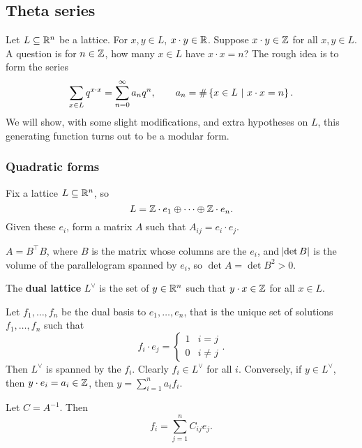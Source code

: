 \pagebreak

\subsection{Theta series}

Let $ L \subseteq \mathbb{R}^n $ be a lattice. For $ x, y \in L $, $ x \cdot y \in \mathbb{R} $. Suppose $ x \cdot y \in \mathbb{Z} $ for all $ x, y \in L $. A question is for $ n \in \mathbb{Z} $, how many $ x \in L $ have $ x \cdot x = n $? The rough idea is to form the series
$$ \sum_{x \in L} q^{x \cdot x} = \sum_{n = 0}^\infty a_nq^n, \qquad a_n = \#\cbr{x \in L \st x \cdot x = n}. $$
We will show, with some slight modifications, and extra hypotheses on $ L $, this generating function turns out to be a modular form.

\subsubsection{Quadratic forms}

Fix a lattice $ L \subseteq \mathbb{R}^n $, so
$$ L = \mathbb{Z} \cdot e_1 \oplus \dots \oplus \mathbb{Z} \cdot e_n. $$
Given these $ e_i $, form a matrix $ A $ such that $ A_{ij} = e_i \cdot e_j $.

\begin{note*}
$ A = B^\intercal B $, where $ B $ is the matrix whose columns are the $ e_i $, and $ \abs{\det B} $ is the volume of the parallelogram spanned by $ e_i $, so $ \det A = \det B^2 > 0 $.
\end{note*}

\begin{definition}
The \textbf{dual lattice} $ L^\vee $ is the set of $ y \in \mathbb{R}^n $ such that $ y \cdot x \in \mathbb{Z} $ for all $ x \in L $.
\end{definition}

Let $ f_1, \dots, f_n $ be the dual basis to $ e_1, \dots, e_n $, that is the unique set of solutions $ f_1, \dots, f_n $ such that
$$ f_i \cdot e_j =
\begin{cases}
1 & i = j \\
0 & i \ne j
\end{cases}.
$$
Then $ L^\vee $ is spanned by the $ f_i $. Clearly $ f_i \in L^\vee $ for all $ i $. Conversely, if $ y \in L^\vee $, then $ y \cdot e_i = a_i \in \mathbb{Z} $, then $ y = \sum_{i = 1}^n a_if_i $.

\begin{proposition}
Let $ C = A^{-1} $. Then
$$ f_i = \sum_{j = 1}^n C_{ij}e_j. $$
\end{proposition}

